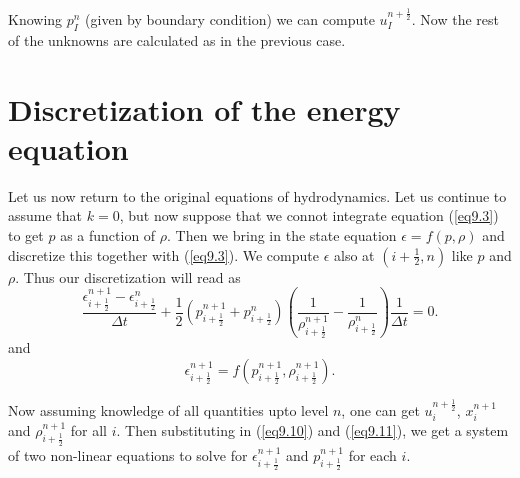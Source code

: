 Knowing $p^n_I$ (given by boundary condition) we can compute $u^{n+\frac{1}{2}}_I$. Now the rest of the unknowns are calculated as in the previous case. 

\section{Discretization of the energy equation}\label{chap9:sec9.4}
Let us now return to the original equations of hydrodynamics. Let us continue to assume that $k=0$, but now suppose that we connot integrate equation (\ref{eq9.3}) to get $p$ as a function of $\rho$. Then we bring in the state equation $\epsilon = f(p, \rho)$ and discretize this together with (\ref{eq9.3}). We compute $\epsilon$ also at $(i+\frac{1}{2}, n)$ like $p$ and $\rho$. Thus our discretization will read as 
\begin{equation*}
\frac{\epsilon^{n+1}_{i+\frac{1}{2}} -
  \epsilon^n_{i+\frac{1}{2}}}{\Delta t} + \frac{1}{2}
\left(p^{n+1}_{i+\frac{1}{2}} + p^n_{i+\frac{1}{2}}\right)
\left(\frac{1}{\rho^{n+1}_{i+\frac{1}{2}}} -
\frac{1}{\rho^n_{i+\frac{1}{2}}}\right) \frac{1}{\Delta t} = 0.\tag{9.10}\label{eq9.10}
\end{equation*}
and 
\begin{equation*}
\epsilon^{n+1}_{i+\frac{1}{2}} = f\left(p^{n+1}_{i+\frac{1}{2}},
\rho^{n+1}_{i+\frac{1}{2}}\right). \tag{9.11}\label{eq9.11} 
\end{equation*}

Now assuming knowledge of all quantities upto level $n$, one can get $u^{n+\frac{1}{2}}_i$, $x^{n+1}_i$ and $\rho^{n+1}_{i+\frac{1}{2}}$ for all $i$. Then substituting in (\ref{eq9.10}) and (\ref{eq9.11}), we get a system of two non-linear equations to solve for $\epsilon^{n+1}_{i+\frac{1}{2}}$ and $p^{n+1}_{i+\frac{1}{2}}$ for each $i$.

